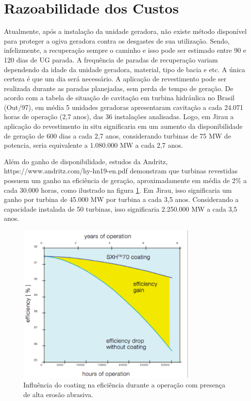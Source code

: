 \section{Razoabilidade dos Custos}

Atualmente, após a instalação da unidade geradora, não existe método disponível
para proteger a ogiva geradora contra os desgastes de sua utilização. Sendo,
infelizmente, a recuperação sempre o caminho e isso pode ser estimado entre 90 e
120 dias de UG parada. A frequência de paradas de recuperação variam dependendo
da idade da unidade geradora, material, tipo de bacia e etc. A única certeza é
que um dia será necessário. A aplicação de revestimento pode ser realizada
durante as paradas planejadas, sem perda de tempo de geração.
De acordo com a tabela de situação de cavitação em turbina hidráulica no Brasil
(Out/97), em média 5 unidades geradoras apresentaram  cavitação a cada 24.071
horas de operação (2,7 anos), das 36 instalações analisadas. Logo, em Jirau a
aplicação do revestimento in situ significaria em um aumento da disponibilidade
de geração de 600 dias a cada 2,7 anos, considerando turbinas de 75 MW de
potencia, seria equivalente a 1.080.000 MW a cada 2,7 anos.

Além do ganho de disponibilidade, estudos da Andritz,
https://www.andritz.com/hy-hn19-en.pdf demonstram que turbinas revestidas
possuem um ganho na eficiência de geração, aproximadamente em média de 2\% a
cada 30.000 horas, como ilustrado na figura \ref{fig:coating_graph}. Em Jirau,
isso significaria um ganho por turbina de 45.000 MW por turbina a cada 3,5 anos. Considerando a capacidade instalada de
50 turbinas, isso significaria 2.250.000 MW a cada 3,5 anos.

\begin{figure}[h!]
\includegraphics[width=0.8\textwidth]{figs/coating_graph}
\caption{Influência do coating na eficiência durante a operação com presença de
alta erosão abrasiva.}
\label{fig:coating_graph}
\end{figure}

